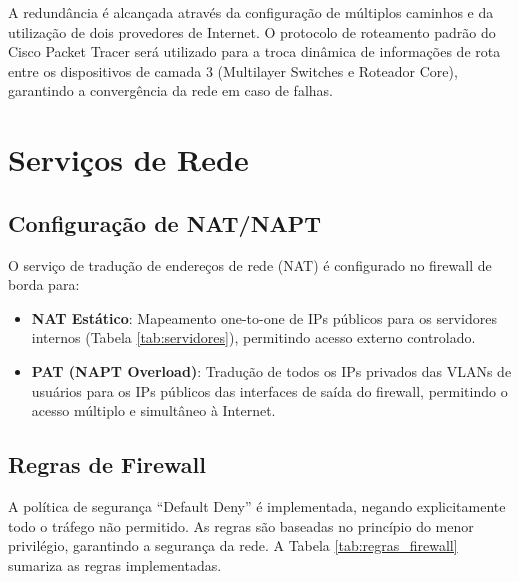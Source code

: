 \documentclass[a4paper, 12pt]{article}
\begin{document}
A redundância é alcançada através da configuração de múltiplos caminhos e da utilização de dois provedores de Internet. O protocolo de roteamento padrão do Cisco Packet Tracer será utilizado para a troca dinâmica de informações de rota entre os dispositivos de camada 3 (Multilayer Switches e Roteador Core), garantindo a convergência da rede em caso de falhas.

\section{Serviços de Rede}
\label{sec:servicos}

\subsection{Configuração de NAT/NAPT}
\label{subsec:nat}

O serviço de tradução de endereços de rede (NAT) é configurado no firewall de borda para:
\begin{itemize}
    \item \textbf{NAT Estático}: Mapeamento one-to-one de IPs públicos para os servidores internos (Tabela \ref{tab:servidores}), permitindo acesso externo controlado.
    \item \textbf{PAT (NAPT Overload)}: Tradução de todos os IPs privados das VLANs de usuários para os IPs públicos das interfaces de saída do firewall, permitindo o acesso múltiplo e simultâneo à Internet.
\end{itemize}

\subsection{Regras de Firewall}
\label{subsec:firewall}

A política de segurança ``Default Deny'' é implementada, negando explicitamente todo o tráfego não permitido. As regras são baseadas no princípio do menor privilégio, garantindo a segurança da rede. A Tabela \ref{tab:regras_firewall} sumariza as regras implementadas.
\end{document}
